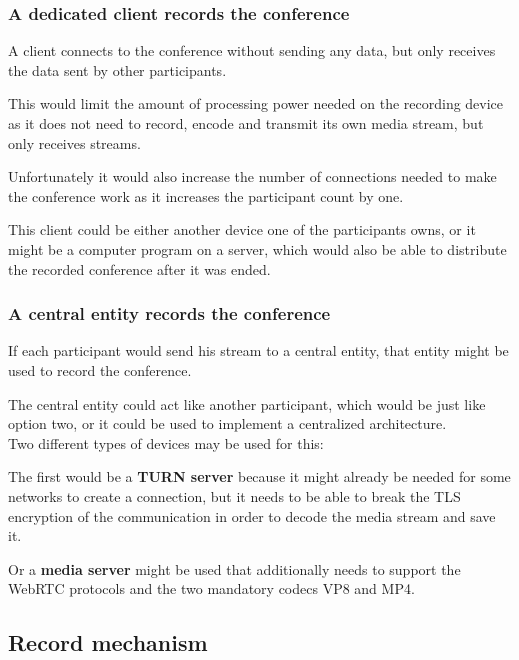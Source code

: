 \documentclass[../../../thesis.tex]{subfiles}
\begin{document}
\subsubsection{A dedicated client records the conference}
A client connects to the conference without sending any data, but only receives the data sent by other participants.\par
This would limit the amount of processing power needed on the recording device as it does not need to record, encode and transmit its own media stream, but only receives streams.\par
Unfortunately it would also increase the number of connections needed to make the conference work as it increases the participant count by one.\par
This client could be either another device one of the participants owns, or it might be a computer program on a server, which would also be able to distribute the recorded conference after it was ended.

\subsubsection{A central entity records the conference}
If each participant would send his stream to a central entity, that entity might be used to record the conference.\par
The central entity could act like another participant, which would be just like option two, or it could be used to implement a centralized architecture.\\

\noindent Two different types of devices may be used for this:\par
The first would be a \textbf{TURN server} because it might already be needed for some networks to create a connection\footnotemark, but it needs to be able to break the TLS encryption of the communication in order to decode the media stream and save it.\par
Or a \textbf{media server} might be used that additionally needs to support the WebRTC protocols and the two mandatory codecs VP8 and MP4.


\subsection{Record mechanism}
\end{document}
